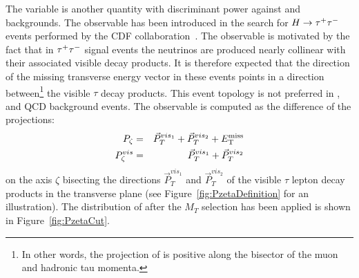 The \Pzeta variable is another quantity with discriminant power against \WpJets
and \ttbar backgrounds.  The observable has been introduced in the search for
$H\to\tau^+\tau^-$ events performed by the CDF collaboration~\cite{CDFrefPzeta}.  The
observable is motivated by the fact that in $\tau^+\tau^-$ signal events the neutrinos
are produced nearly collinear with their associated visible decay products. It
is therefore expected that the direction of the missing transverse energy vector
in these events points in a direction between\footnote{In other words, the
projection of \VMET is positive along the bisector of the muon and hadronic tau
momenta.} the visible
$\tau$ decay products. This event topology is not preferred in \WpJets, 
\ttbar and QCD background events.  The observable is computed as the
difference of the projections:
\begin{eqnarray}
P_{\zeta} &=& \vec{P}_{T}^{vis_{1}} + \vec{P}_{T}^{vis_{2}} + E_{\mathrm{T}}^{\text{miss}} \nonumber \\
P_{\zeta}^{vis} &=& \vec{P}_{T}^{vis_{1}} + \vec{P}_{T}^{vis_{2}} \nonumber
\end{eqnarray}
on the axis $\zeta$ bisecting the directions $\vec{P}_{T}^{vis_{1}}$ and
$\vec{P}_{T}^{vis_{2}}$ of the visible $\tau$ lepton decay products in the
transverse plane (see Figure~\ref{fig:PzetaDefinition} for an illustration).
The distribution of \Pzeta after the $M_T$ selection has been applied is shown
in Figure~\ref{fig:PzetaCut}.

